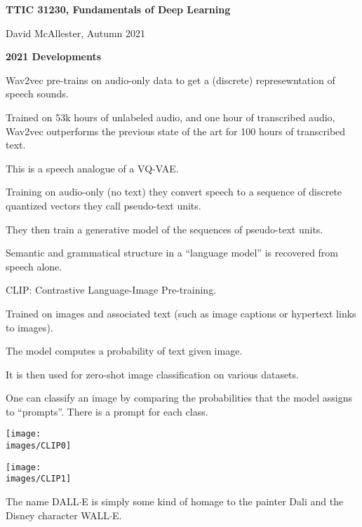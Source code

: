 




{\Huge
  \centerline{\bf TTIC 31230,  Fundamentals of Deep Learning}
  \vfill
  \centerline{David McAllester, Autumn 2021}
  \vfill
  \centerline{\bf 2021 Developments}

\vfill
\vfill


Wav2vec pre-trains on audio-only data to get a (discrete) represewntation of speech sounds.

\vfill
Trained on 53k hours of unlabeled audio, and one hour of transcribed audio, Wav2vec outperforms the previous state of the art for 100 hours of transcribed text.



This is a speech analogue of a VQ-VAE.

\vfill
Training on audio-only (no text) they convert speech to a sequence of discrete quantized vectors they call pseudo-text units.

\vfill
They then train a generative model of the sequences of pseudo-text units.

\vfill
Semantic and grammatical structure in a ``language model'' is recovered
from speech alone.



CLIP: Contrastive Language-Image Pre-training.

\vfill
Trained on images and associated text (such as image captions or hypertext links to images).

\vfill
The model computes a probability of text given image.

\vfill
It is then used for zero-shot image classification on various datasets.

\vfill
One can classify an image by comparing the probabilities that the model assigns to ``prompts''.  There is a prompt for each class.


\centerline{\texttt{[image: \\images/CLIP0]}}


\centerline{\texttt{[image: \\images/CLIP1]}}


The name DALL$\cdot$E is simply some kind of homage to the painter Dali and the Disney character WALL$\cdot$E.

}
